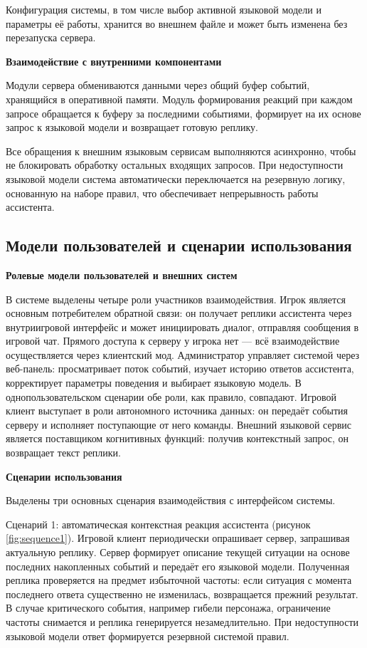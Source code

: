 Конфигурация системы, в том числе выбор активной языковой модели и параметры её работы, хранится во внешнем файле и может быть изменена без перезапуска сервера.

\textbf{Взаимодействие с внутренними компонентами}

Модули сервера обмениваются данными через общий буфер событий, хранящийся в оперативной памяти. Модуль формирования реакций при каждом запросе обращается к буферу за последними событиями, формирует на их основе запрос к языковой модели и возвращает готовую реплику.

Все обращения к внешним языковым сервисам выполняются асинхронно, чтобы не блокировать обработку остальных входящих запросов. При недоступности языковой модели система автоматически переключается на резервную логику, основанную на наборе правил, что обеспечивает непрерывность работы ассистента.

\subsection{Модели пользователей и сценарии использования}

\textbf{Ролевые модели пользователей и внешних систем}

В системе выделены четыре роли участников взаимодействия. Игрок является основным потребителем обратной связи: он получает реплики ассистента через внутриигровой интерфейс и может инициировать диалог, отправляя сообщения в игровой чат. Прямого доступа к серверу у игрока нет — всё взаимодействие осуществляется через клиентский мод. Администратор управляет системой через веб-панель: просматривает поток событий, изучает историю ответов ассистента, корректирует параметры поведения и выбирает языковую модель. В однопользовательском сценарии обе роли, как правило, совпадают. Игровой клиент выступает в роли автономного источника данных: он передаёт события серверу и исполняет поступающие от него команды. Внешний языковой сервис является поставщиком когнитивных функций: получив контекстный запрос, он возвращает текст реплики.

\textbf{Сценарии использования}

Выделены три основных сценария взаимодействия с интерфейсом системы.

Сценарий 1: автоматическая контекстная реакция ассистента (рисунок \ref{fig:sequence1}). Игровой клиент периодически опрашивает сервер, запрашивая актуальную реплику. Сервер формирует описание текущей ситуации на основе последних накопленных событий и передаёт его языковой модели. Полученная реплика проверяется на предмет избыточной частоты: если ситуация с момента последнего ответа существенно не изменилась, возвращается прежний результат. В случае критического события, например гибели персонажа, ограничение частоты снимается и реплика генерируется незамедлительно. При недоступности языковой модели ответ формируется резервной системой правил.

